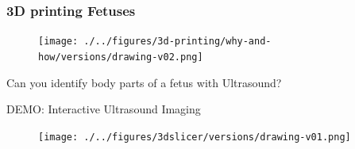 {
\begin{frame}
  \frametitle{3D printing Fetuses}
  \vspace{10pt}
        \begin{figure}
        \centering
        \texttt{[image: ./../figures/3d-printing/why-and-how/versions/drawing-v02.png]}
      \end{figure}

\end{frame}
}





{
\begin{frame}{}

\BigSizeFont
\begin{center}
    Can you identify body parts of a fetus with Ultrasound?
\end{center}
\end{frame}
}

{


\begin{frame}{DEMO: Interactive Ultrasound Imaging }
      \begin{figure}
        \centering
        \texttt{[image: ./../figures/3dslicer/versions/drawing-v01.png]}
      \end{figure}
\end{frame}
}




